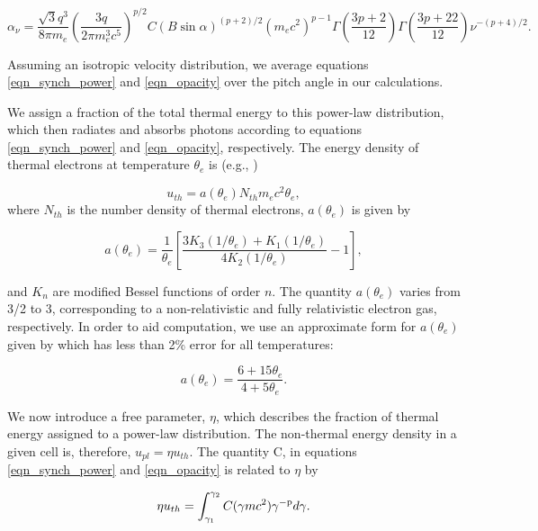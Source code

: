 \begin{equation}
	\alpha_{\nu}=\frac{\sqrt{3}q^3}{8\pi m_e}\left(\frac{3q}{2 \pi m_e^3 c^5}\right)^{p/2}C(B\sin\alpha)^{(p+2)/2}(m_e c^2)^{p-1}\Gamma\left(\frac{3p+2}{12}\right)\Gamma\left(\frac{3p+22}{12}\right)\nu^{-(p+4)/2}.
	\label{eqn_opacity}
\end{equation}

Assuming an isotropic velocity distribution, we average equations \ref{eqn_synch_power} and \ref{eqn_opacity} over the pitch angle in our calculations.  

We assign a fraction of the total thermal energy to this power-law distribution, which then radiates and absorbs photons according to equations \ref{eqn_synch_power} and \ref{eqn_opacity}, respectively.  The energy density of thermal electrons at temperature $\theta_e$ is (e.g., \citealt{chandrasekhar1939})

\begin{equation}
	u_{th}=a(\theta_e)N_{th}m_e c^2 \theta_e,
\end{equation}
where $N_{th}$ is the number density of thermal electrons, $a(\theta_e)$ is given by

\begin{equation}
	a(\theta_e)=\frac{1}{\theta_e}\left[\frac{3 K_3 (1/\theta_e)+ K_1(1/\theta_e)}{4K_2(1/\theta_e)}-1\right],
\end{equation}

and $K_n$ are modified Bessel functions of order $n$.  The quantity $a(\theta_e)$ varies from 3/2 to 3, corresponding to a non-relativistic and fully relativistic electron gas, respectively.  In order to aid computation, we use an approximate form for $a(\theta_e)$ given by \citet{gammie1998} which has less than 2\% error for all temperatures:

\begin{equation}
	a(\theta_e)=\frac{6+15\theta_e}{4+5\theta_e}.
\end{equation}

We now introduce a free parameter, $\eta$, which describes the fraction of thermal energy assigned to a power-law distribution.  The non-thermal energy density in a given cell is, therefore, $u_{pl}=\eta u_{th}$.  The quantity C, in equations \ref{eqn_synch_power} and \ref{eqn_opacity} is related to $\eta$ by

\begin{equation}
	\eta u_{th} = \int_{\gamma_1}^{\gamma_2}C(\gamma mc^2) \gamma^{-\rm{p}}d\gamma. 
\end{equation}

